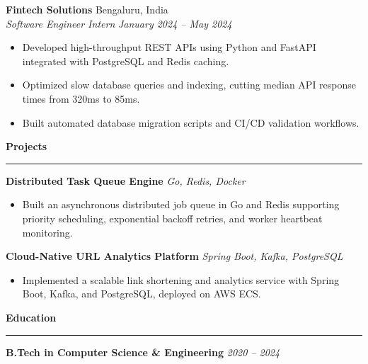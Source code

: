 \documentclass[11pt,a4paper]{article}
\begin{document}
\vspace{4pt}

\noindent\textbf{Fintech Solutions} \hfill Bengaluru, India\\
\textit{Software Engineer Intern} \hfill \textit{January 2024 -- May 2024}
\begin{itemize}[leftmargin=1.5em, itemsep=2pt]
    \item Developed high-throughput REST APIs using Python and FastAPI integrated with PostgreSQL and Redis caching.
    \item Optimized slow database queries and indexing, cutting median API response times from 320ms to 85ms.
    \item Built automated database migration scripts and CI/CD validation workflows.
\end{itemize}

\vspace{6pt}

\noindent\textbf{\large Projects}
\vspace{2pt}
\hrule
\vspace{4pt}

\noindent\textbf{Distributed Task Queue Engine} \hfill \textit{Go, Redis, Docker}\\
\begin{itemize}[leftmargin=1.5em, itemsep=2pt]
    \item Built an asynchronous distributed job queue in Go and Redis supporting priority scheduling, exponential backoff retries, and worker heartbeat monitoring.
\end{itemize}

\noindent\textbf{Cloud-Native URL Analytics Platform} \hfill \textit{Spring Boot, Kafka, PostgreSQL}\\
\begin{itemize}[leftmargin=1.5em, itemsep=2pt]
    \item Implemented a scalable link shortening and analytics service with Spring Boot, Kafka, and PostgreSQL, deployed on AWS ECS.
\end{itemize}

\vspace{6pt}

\noindent\textbf{\large Education}
\vspace{2pt}
\hrule
\vspace{4pt}
\noindent\textbf{B.Tech in Computer Science \& Engineering} \hfill \textit{2020 -- 2024}
\end{document}

